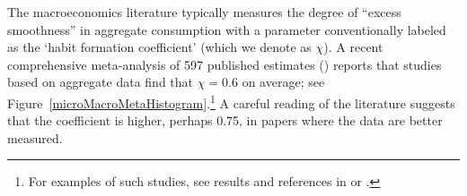 \documentclass[titlepage]{\econtex}\newcommand{\texname}{cAndCwithStickyE}
\begin{document}

The macroeconomics literature typically measures the degree of ``excess smoothness'' in aggregate consumption with a parameter conventionally labeled as the `habit formation coefficient' (which we denote as $\chi$). A recent comprehensive meta-analysis of 597 published estimates (\cite{hrsHabit}) reports that studies based on aggregate data find that $\chi=0.6$ on average; see Figure~\ref{microMacroMetaHistogram}.\footnote{For examples of such studies, see results and references in \cite{fuhrer:habits} or \cite{cee:habits}.}  A careful reading of the literature suggests that the coefficient is higher, perhaps 0.75, in papers where the data are better measured.
\end{document}
